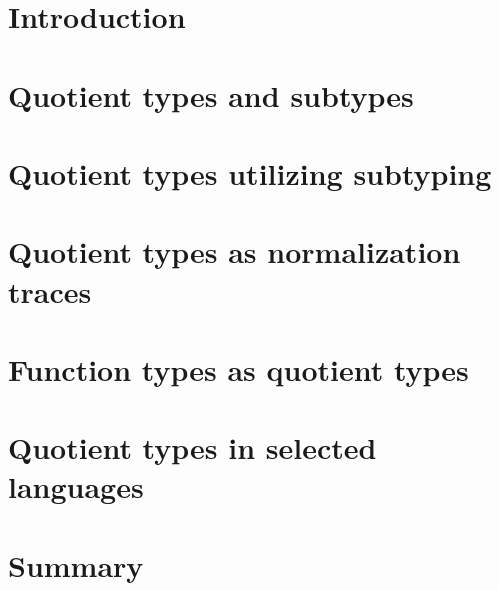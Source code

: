 \documentclass[shortabstract, mgr, english]{iithesis}
\author         {Marek Bauer}
\date          {24 października 2023}                     %
\begin{document}

    \chapter{Introduction}
	
	
    \chapter{Quotient types and subtypes}
	

    \chapter{Quotient types utilizing subtyping}
	

    \chapter{Quotient types as normalization traces}
	

    \chapter{Function types as quotient types}
	

    \chapter{Quotient types in selected languages}
	

    \chapter{Summary}
	

        
%	     
	
\end{document}
